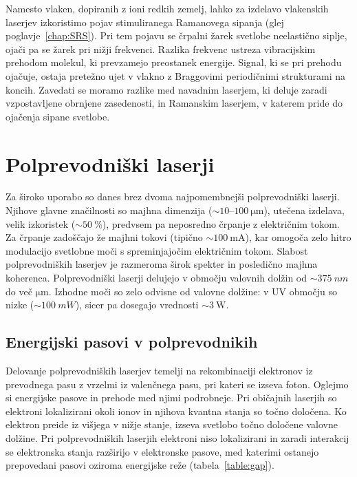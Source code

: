 \begin{remark}
 Namesto vlaken, dopiranih z ioni redkih zemelj, lahko za izdelavo vlakenskih laserjev
 izkoristimo pojav stimuliranega Ramanovega sipanja (glej poglavje~\ref{chap:SRS}). 
 Pri tem pojavu se črpalni žarek svetlobe neelastično siplje, ojači pa se žarek 
 pri nižji frekvenci. Razlika frekvenc ustreza vibracijskim prehodom 
 molekul, ki prevzamejo preostanek energije. Signal, ki se pri prehodu ojačuje, 
 ostaja pretežno ujet v vlakno z Braggovimi periodičnimi strukturami na koncih.
 Zavedati se moramo razlike med navadnim laserjem, ki deluje zaradi vzpostavljene
 obrnjene zasedenosti, in Ramanskim laserjem, v katerem pride do ojačenja sipane
 svetlobe. 
\end{remark}

\section{Polprevodniški laserji}
Za široko uporabo so danes brez dvoma najpomembnejši polprevodniški laserji.
Njihove glavne značilnosti so majhna dimenzija ($\sim 10$--$100~\si{\micro\metre}$), 
utečena izdelava, velik izkoristek ($\sim 50~\%$), predvsem pa neposredno 
črpanje z električnim tokom. Za črpanje zadoščajo že majhni tokovi 
(tipično $\sim 100~\si{\milli\ampere}$), kar omogoča zelo hitro modulacijo 
svetlobne moči s spreminjajočim električnim tokom. 
Slabost polprevodniških laserjev je razmeroma širok 
spekter in posledično majhna koherenca. Polprevodniški laserji delujejo v območju 
valovnih dolžin od $\sim 375~\si{nm}$ do več $\si{\micro\meter}$. Izhodne moči
so zelo odvisne od valovne dolžine: v UV območju so nizke ($\sim 100~\si{mW}$),
sicer pa dosegajo vrednosti $\sim 3~\si{\watt}$.

\subsection*{Energijski pasovi v polprevodnikih}
Delovanje polprevodniških laserjev temelji na rekombinaciji elektronov 
iz prevodnega pasu z vrzelmi iz valenčnega pasu, pri kateri se izseva foton. 
Oglejmo si energijske pasove in prehode med njimi podrobneje.  
Pri običajnih laserjih so elektroni
lokalizirani okoli ionov in njihova kvantna stanja so točno določena. Ko elektron
preide iz višjega v nižje stanje, izseva svetlobo točno določene valovne dolžine. 
Pri polprevodniških laserjih elektroni niso lokalizirani in zaradi interakcij 
se elektronska stanja razširijo v elektronske pasove, med katerimi ostanejo 
prepovedani pasovi oziroma energijske reže (tabela~\ref{table:gap}). 

